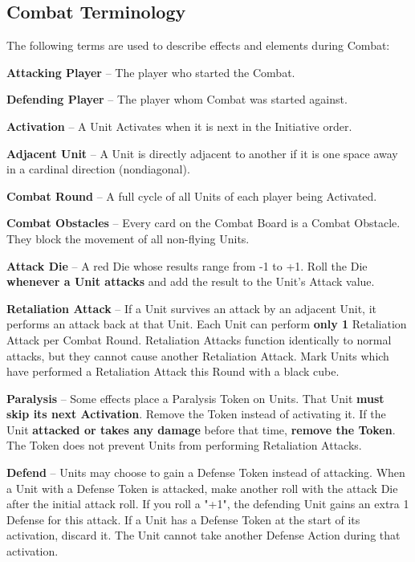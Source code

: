 \begin{multicols}{2}
\subsection*{\hypertarget{Combatterminology}{Combat Terminology}}
The following terms are used to describe effects and elements during Combat:\par
\textbf{Attacking Player} – The player who started the Combat.\par
\textbf{Defending Player} – The player whom Combat was started against.\par
\textbf{Activation} – A Unit Activates when it is next in the Initiative order.\par
\textbf{Adjacent Unit} – A Unit is directly adjacent to another if it is one space away in a cardinal direction (nondiagonal).\par
\textbf{Combat Round} – A full cycle of all Units of each player being Activated.\par
\textbf{Combat Obstacles} – Every card on the Combat Board is a Combat Obstacle.
They block the movement of all non-flying Units.\par
{}\parbox{0.7\hsize}{\textbf{Attack Die} – A red Die whose results range from -1 to +1.
Roll the Die \textbf{whenever a Unit attacks} and
add the result to the Unit's Attack value.}\par
\textbf{\hypertarget{Retaliate}{Retaliation Attack}} – If a Unit survives an attack by an adjacent Unit, it performs an attack back at that Unit.
Each Unit can perform \textbf{only 1} Retaliation Attack per Combat Round.
Retaliation Attacks function identically to normal attacks, but they cannot cause another Retaliation Attack.
Mark Units which have performed a Retaliation Attack this Round with a black cube.\par
\textbf{Paralysis}  – Some effects place a Paralysis Token on Units.
That Unit \textbf{must skip its next Activation}. Remove the Token instead of activating it.
If the Unit \textbf{attacked or takes any damage} before that time, \textbf{remove the Token}.
The Token does not prevent Units from performing Retaliation Attacks.\par
\textbf{\hypertarget{Defend}{Defend}}  – Units may choose to gain a Defense Token instead of attacking.
When a Unit with a Defense Token is attacked, make another roll with the attack Die after the initial attack roll.
If you roll a "+1", the defending Unit gains an extra 1 Defense for this attack.
If a Unit has a Defense Token at the start of its activation, discard it.
The Unit cannot take another Defense Action during that activation.


\end{multicols}
